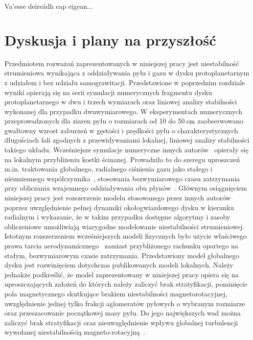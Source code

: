 \begin{savequote}[75mm]
   Va'esse deireádh eap eigean$\ldots$
\end{savequote}

\chapter{Dyskusja i plany na przyszłość}
Przedmiotem rozważań zaprezentowanych w niniejszej pracy jest niestabilność
strumieniowa wynikająca z oddziaływania pyłu i gazu w dysku protoplanetarnym z
udziałem i bez udziału samograwitacji. Przedstawione w poprzednim rozdziale
wyniki opierają się na serii symulacji numerycznych fragmentu dysku
protoplanetarnego w dwu i trzech wymiarach oraz liniowej analizy stabilności
wykonanej dla przypadku dwuwymiarowego.
%
%
W eksperymentach numerycznych przeprowadzonych dla ziaren pyłu o rozmiarach od
10 do 50$\hbox{$\thinspace\textrm{cm}$}$ zaobserwowano gwałtowny wzrost zaburzeń w gęstości i prędkości
pyłu o charakterystycznych długościach fali zgodnych z przewidywaniami lokalnej,
liniowej analizy stabilności takiego układu. Wcześniejsze symulacje numeryczne
innych autorów~\cite{YG05, JY07, TB09, BS10a, BS10b} opierały się na lokalnym
przybliżeniu kostki ścinanej. Prowadziło to do szeregu uproszczeń m.in.
traktowania globalnego, radialnego ciśnienia gazu jako stałego i niezmiennego
współczynnika~\cite{N86}, stosowania bezwymiarowego czasu zatrzymania przy
obliczaniu wzajemnego oddziaływania obu płynów~\cite{YG05}. Głównym
osiągnięciem niniejszej pracy jest rozszerzenie modelu stosowanego przez innych
autorów poprzez uwzględnienie pełnej dynamiki okołogwiazdowego dysku w kierunku
radialnym i wykazanie, że w takim przypadku dostępne algorytmy i zasoby
obliczeniowe umożliwiają wiarygodne modelowanie niestabilności
strumieniowej. Istotnym rozszerzeniem wcześniejszych modeli fizycznych było 
użycie właściwego prawa tarcia aerodynamicznego~
zamiast przybliżonego rachunku opartego na stałym, bezwymiarowym czasie
zatrzymania. 
%
Przedstawiony model globalnego dysku jest rozwinięciem dotychczas
publikowanych modeli lokalnych. Należy jednakże podkreślić, że model zaprezentowany 
w niniejszej pracy opiera się na uproszczających założeń do których należy
zaliczyć brak stratyfikacji, pominięcie pola magnetycznego skutkujące
brakiem niestabilności magnetorotacyjnej, uwzględnienie jednej tylko frakcji
aglomeratów pyłowych o wybranym rozmiarze oraz przeszacowanie początkowej masy
pyłu.
%
Do jego największych wad można zaliczyć brak stratyfikacji oraz nieuwzględnienie
wpływu globalnej turbulencji wywołanej niestabilnością
magneto-rotacyjną~\cite{DKJ14}. 

